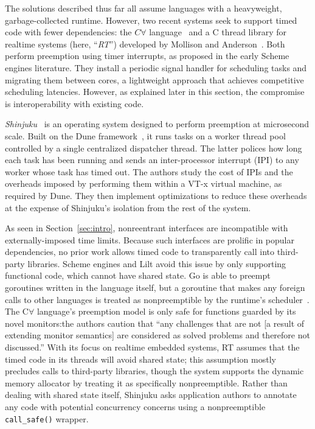 The solutions described thus far all assume languages with a heavyweight,
garbage-collected runtime.  However, two recent systems seek
to support timed code with fewer dependencies: the $C\forall$
language~\cite{delisle:wcs2018} and a C thread library for realtime systems (here,
``\textit{RT}'') developed by Mollison and Anderson~\cite{mollison:rtas2013}.
Both perform preemption using timer interrupts, as proposed in the early Scheme
engines literature.  They install a periodic signal handler for scheduling
tasks and migrating them between cores, a lightweight approach that achieves
competitive scheduling latencies.
However, as explained later in this section, the compromise is interoperability with
existing code.

\textit{Shinjuku}~\cite{Kaffes:nsdi2019} is an operating system designed to perform
preemption at microsecond scale.  Built on the Dune framework~\cite{Belay:osdi2012},
it runs tasks on a worker thread pool controlled by a single centralized
dispatcher thread.  The latter polices how long each task has been running and
sends an inter-processor interrupt (IPI) to any worker whose task has timed out.
The authors study the cost of IPIs and the overheads
imposed by performing them within a VT-x virtual machine, as required by Dune.  They
then implement optimizations to reduce these overheads at the expense of Shinjuku's
isolation from the rest of the system.

As seen in Section~\ref{sec:intro}, nonreentrant interfaces are
incompatible with externally-imposed time limits.  Because such interfaces are
prolific in popular dependencies, no prior work allows timed code to transparently
call into third-party libraries.  Scheme engines and
Lilt avoid this issue by only supporting functional code, which cannot have shared
state.  Go is able to preempt goroutines written in the language itself, but a
goroutine that makes any foreign calls to other languages is treated as
nonpreemptible by the runtime's scheduler~\cite{www-golang-fficall}.
The C$\forall$ language's preemption model is only safe for functions guarded
by its novel monitors:\@ the authors caution that ``any challenges that are not [a
result of extending monitor semantics] are considered as solved problems and
therefore not discussed.''
With its focus on realtime embedded systems, RT assumes
that the timed code in its threads will avoid shared state; this assumption mostly
precludes
calls to third-party libraries, though the system supports the dynamic memory
allocator by treating it as specifically nonpreemptible.  Rather than dealing with
shared state itself, Shinjuku asks application authors to annotate any code with
potential concurrency concerns using a nonpreemptible \texttt{call\_safe()} wrapper.
